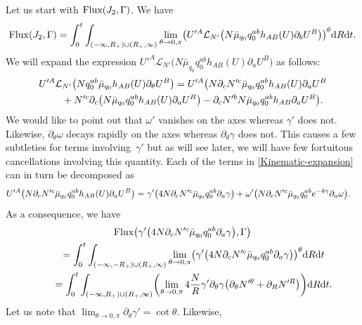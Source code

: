 \documentclass[11pt]{article}
\numberwithin{equation}{section}
\def\ptl{\partial}%
\numberwithin{equation}{section}
\begin{document}
Let us start with ${\rm Flux} (J_2, \Gamma)$. We have
\begin{align*}
{\rm Flux}(J_2, \Gamma)= \int^t_0 \int_{ (-\infty, R_+) \cup (R_+, \infty) } \lim_{\theta \to 0, \pi} \bigl( U'^A \mathcal{L}_{N'} \bigl(N \bar{\mu}_{q_0} q^{ab}_0 h_{AB}(U) \ptl_b U^B\bigr) \bigr)^\theta {\rm d}R {\rm d}t .\notag
\end{align*}
We will expand the expression $U'^A \mathcal{L}_{N'} \bigl(N \bar{\mu}_{q_0} q_0^{ab} h_{AB}(U) \ptl_a U^B\bigr)$ as follows:
\begin{gather}
U'^A \mathcal{L}_{N'} \bigl(N q^{ab}_0\bar{\mu}_{q_0} h_{AB}(U) \ptl_\theta U^B \bigr)= U'^A \bigl(N \ptl_c N'^c \bar{\mu}_{q_0} q^{ab}_0 h_{AB}(U) \ptl_a U^B \notag\\
\qquad{}+ N'^c \ptl_c \bigl(N \bar{\mu}_{q_0} q_0^{ab} h_{AB}(U) \ptl_a U^B\bigr) - \ptl_c N'^b N \bar{\mu}_{q_0} q^{ab}_0 h_{AB} \ptl_a U^B\bigr).\label{Kinematic-expansion}
\end{gather}
We would like to point out that $\omega'$ vanishes on the axes whereas $\gamma'$ does not. Likewise, $\ptl_\theta \omega$ decays rapidly on the axes whereas $\ptl_\theta \gamma$ does not. This causes a few subtleties for terms involving~$\gamma'$ but as will see later, we will have few fortuitous cancellations involving this quantity.
Each of the terms in \eqref{Kinematic-expansion} can in turn be decomposed as
\begin{align*}
U'^A \bigl(N \ptl_c N'^c \bar{\mu}_{q_0} q^{ab}_0 h_{AB}(U) \ptl_a U^B\bigr) &{}= \gamma' \bigl(4 N \ptl_c N'^c \bar{\mu}_{q_0} q^{ab} _0 \ptl_a \gamma\bigr)
 + \omega' \bigl(N \ptl_c N'^c \bar{\mu}_{q_0} q^{ab} _0 {\rm e}^{-4 \gamma} \ptl_a \omega\bigr).
\end{align*}
As a consequence, we have
\begin{gather}
{\rm Flux} \bigl(\gamma' \bigl(4 N \ptl_c N'^c \bar{\mu}_{q_0} q^{ab} _0 \ptl_a \gamma\bigr), \Gamma\bigr) \notag\\
\qquad{}= \int^t_0 \int_{ (-\infty, -R_+) \cup (R_+, \infty) } \lim_{\theta \to 0, \pi} \bigl(\gamma' \bigl(4 N \ptl_c N'^c \bar{\mu}_{q_0} q^{ab} _0 \ptl_a \gamma\bigr) \bigr)^\theta {\rm d}R {\rm d}t \notag\\
\qquad{}= \int^t_0 \int_{ (-\infty, R_+) \cup (R_+, \infty) } \biggl( \lim_{\theta \to 0, \pi} 4 \frac{N}{R} \gamma' \ptl_\theta \gamma \bigl(\ptl_\theta N'^\theta + \ptl_R N'^R\bigr) \biggr) {\rm d}R {\rm d}t.\label{kin-flux-axes-1}
\end{gather}
Let us note that $\lim_{\theta \to 0, \pi} \ptl_\theta \gamma' = \cot \theta$. Likewise,
\end{document}
